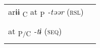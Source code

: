 \begin{table}
\begin{tabular}{ll}
                                                                                                                                                                                                                                                                                                                                                                                                                                                                                                                                \\
  arɨɨ\textsubscript{ C}  at\textsubscript{ P}  \textit{-təər} (\textsc{rsl})                                                                                                                                                                                                                                                                                                                                                                                                                                                   \\
                                                                                                                                                                                                                                                                                                                                                                                                                                                                                                                                \\
    at\textsubscript{ P/C}  \textit{-tɨ} (\textsc{seq})                                                                                                                                                                                                                                                                                                                                                                                                                                                                         \\
                                                                                                                                                                                                                                                                                                                                                                                                                                                                                                                                \\

\end{tabular}
\end{table}
